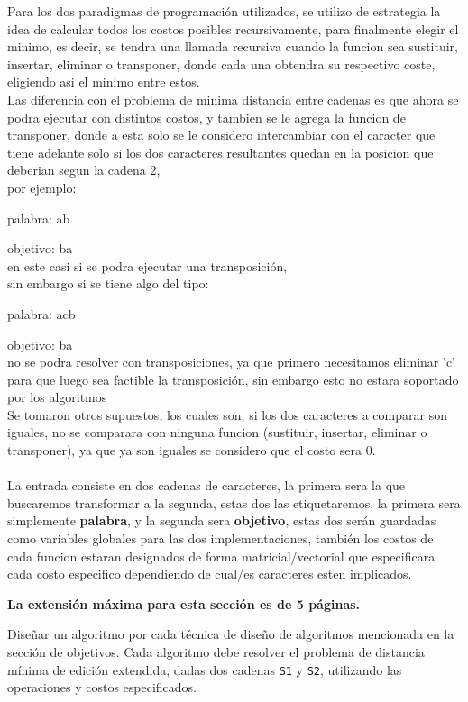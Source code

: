 Para los dos paradigmas de programación utilizados, se utilizo de estrategia la idea de calcular todos los costos posibles recursivamente, para finalmente elegir el minimo, es decir, se tendra una llamada recursiva cuando la funcion sea sustituir, insertar, eliminar o transponer, donde cada una obtendra su respectivo coste, eligiendo asi el minimo entre estos.\\
Las diferencia con el problema de minima distancia entre cadenas es que ahora se podra ejecutar con distintos costos, y tambien se le agrega la funcion de transponer, donde a esta solo se le considero intercambiar con el caracter que tiene adelante solo si los dos caracteres resultantes quedan en la posicion que deberian segun la cadena 2, \\por ejemplo:

palabra: ab

objetivo: ba\\ 
en este casi si se podra ejecutar una transposición, \\sin embargo si se tiene algo del tipo:

palabra: acb

objetivo: ba\\ 
no se podra resolver con transposiciones, ya que primero necesitamos eliminar 'c' para que luego sea factible la transposición, sin embargo esto no estara soportado por los algoritmos\\
Se tomaron otros supuestos, los cuales son, si los dos caracteres a comparar son iguales, no se comparara con ninguna funcion (sustituir, insertar, eliminar o transponer), ya que ya son iguales se considero que el costo sera 0.
\\ \\
La entrada consiste en dos cadenas de caracteres, la primera sera la que buscaremos transformar a la segunda, estas dos las etiquetaremos, la primera sera simplemente \textbf{palabra}, y la segunda sera \textbf{objetivo}, estas dos serán guardadas como variables globales para las dos implementaciones, también los costos de cada funcion estaran designados de forma matricial/vectorial que especificara cada costo especifico dependiendo de cual/es caracteres esten implicados.

\begin{mdframed}
    \textbf{La extensión máxima para esta sección es de 5 páginas.}
\end{mdframed}

Diseñar un algoritmo por cada técnica de diseño de algoritmos mencionada en la sección de objetivos. Cada algoritmo debe resolver el problema de distancia mínima de edición extendida, dadas dos cadenas \texttt{S1} y \texttt{S2}, utilizando las operaciones y costos especificados.

